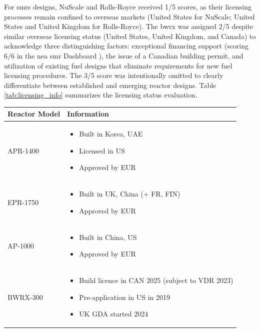 For \glspl{smr} designs, NuScale and Rolls-Royce received 1/5 scores, as their licensing processes remain confined to overseas markets (United States for NuScale; United States and United Kingdom for Rolls-Royce). The \gls{bwrx} was assigned 2/5 despite similar overseas licensing status (United States, United Kingdom, and Canada) to acknowledge three distinguishing factors: exceptional financing support (scoring 6/6 in the \gls{nea} \gls{smr} Dashboard \cite{NEA_SMR_Dashboard_2025}), the issue of a Canadian building permit, and utilization of existing fuel designs that eliminate requirements for new fuel licensing procedures. The 3/5 score was intentionally omitted to clearly differentiate between established and emerging reactor designs. Table \ref{tab:licensing_info} summarizes the licensing status evaluation.
\begin{table}[!hb]
    \begin{tabularx}{\textwidth}{l>{\centering\arraybackslash}X}
        \toprule
        \textbf{Reactor Model} & \textbf{Information} \\
        \midrule
        APR-1400 &
          \begin{itemize}
            \item Built in Korea, UAE
            \item Licensed in US
            \item Approved by EUR
          \end{itemize} \\
        \midrule
        EPR-1750 &
          \begin{itemize}
            \item Built in UK, China (+ FR, FIN)
            \item Approved by EUR
          \end{itemize} \\
        \midrule
        AP-1000 &
          \begin{itemize}
            \item Built in China, US
            \item Approved by EUR
          \end{itemize} \\
        \midrule
        BWRX-300 &
          \begin{itemize}
            \item Build licence in CAN 2025 (subject to VDR 2023)
            \item Pre-application in US in 2019
            \item UK GDA started 2024

\end{itemize}
\end{tabularx}
\end{table}
